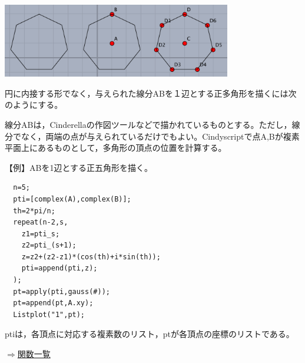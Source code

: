 \documentclass[papersize,a4paper,12pt,uplatex]{jsarticle}
\begin{document}
\begin{description}
\hspace{10mm}\includegraphics[bb=0.00 0.00 541.03 175.01,width=10cm]{Fig/polygonplot2.pdf}

\hspace{10mm}


円に内接する形でなく，与えられた線分ABを１辺とする正多角形を描くには次のようにする。

線分ABは，Cinderellaの作図ツールなどで描かれているものとする。ただし，線分でなく，両端の点が与えられているだけでもよい。Cindyscriptで点A,Bが複素平面上にあるものとして，多角形の頂点の位置を計算する。

\vspace{\baselineskip}
【例】ABを1辺とする正五角形を描く。

\begin{verbatim}
  n=5;
  pti=[complex(A),complex(B)];
  th=2*pi/n;
  repeat(n-2,s,
    z1=pti_s;
    z2=pti_(s+1);
    z=z2+(z2-z1)*(cos(th)+i*sin(th));
    pti=append(pti,z);
  );
  pt=apply(pti,gauss(#));
  pt=append(pt,A.xy);
  Listplot("1",pt);
\end{verbatim}
ptiは，各頂点に対応する複素数のリスト，ptが各頂点の座標のリストである。 

\begin{flushright}  \hyperlink{functionlist}{$\Rightarrow$関数一覧}\end{flushright}

\end{description}
\newpage
\end{document}

